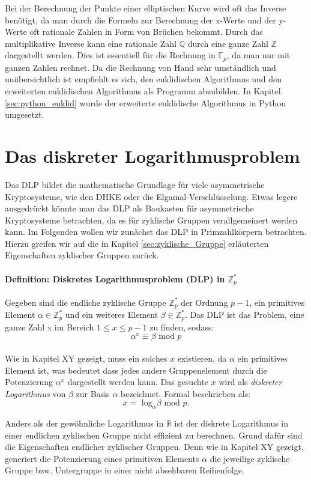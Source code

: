 Bei der Berechnung der Punkte einer elliptischen Kurve wird oft das Inverse benötigt, da man durch die Formeln zur Berechnung der x-Werte und der y-Werte oft rationale Zahlen in Form von Brüchen bekommt. Durch das multiplikative Inverse kann eine rationale Zahl $\mathbb{Q}$ durch eine ganze Zahl $\mathbb{Z}$ dargestellt werden. Dies ist essentiell für die Rechnung in $\mathbb{F}_p$, da man nur mit ganzen Zahlen rechnet. Da die Rechnung von Hand sehr umständlich und unübersichtlich ist empfiehlt es sich, den euklidischen Algorithmus und den erweiterten euklidischen Algorithmus als Programm abzubilden. In Kapitel \ref{sec:python_euklid} wurde der erweiterte euklidische Algorithmus in Python umgesetzt.

\section{Das diskreter Logarithmusproblem} \label{sec:Das_diskrete_Logarithmusproblem}
Das DLP bildet die mathematische Grundlage für viele asymmetrische Kryptosysteme, wie den DHKE oder die Elgamal-Verschlüsselung. Etwas legere ausgedrückt könnte man das DLP als Baukasten für asymmetrische Kryptosysteme betrachten, da es für zyklische Gruppen verallgemeinert werden kann. Im Folgenden wollen wir zunächst das DLP in Primzahlkörpern betrachten. Hierzu greifen wir auf die in Kapitel \ref{sec:zyklische_Gruppe} erläuterten Eigenschaften zyklischer Gruppen zurück. 

\paragraph{Definition: Diskretes Logarithmusproblem (DLP) in $\mathbb{Z}^*_p$}
Gegeben sind die endliche zyklische Gruppe $\mathbb{Z}^*_p$ der Ordnung $p-1$, ein primitives Element $\alpha \in \mathbb{Z}^*_p$ und ein weiteres Element $\beta \in \mathbb{Z}^*_p$. Das DLP ist das Problem, eine ganze Zahl x im Bereich $1 \leq x \leq p-1$ zu finden, sodass: $$\alpha^x \equiv \beta \text{ mod } p$$\\

Wie in Kapitel XY gezeigt, muss ein solches $x$ existieren, da $\alpha$ ein primitives Element ist, was bedeutet dass jedes andere Gruppenelement durch die Potenzierung $\alpha^x$ dargestellt werden kann. Das gesuchte $x$ wird als \textit{diskreter Logarithmus} von $\beta$ zur Basis $\alpha$ bezeichnet. Formal beschrieben als: $$x = \text{ log}_\alpha \beta \text{ mod } p \text{.}$$

Anders als der gewöhnliche Logarithmus in $\mathbb{R}$ ist der diskrete Logarithmus in einer endlichen zyklischen Gruppe nicht effizient zu berechnen. Grund dafür sind die Eigenschaften endlicher zyklischer Gruppen. Denn wie in Kapitel XY gezeigt, generiert die Potenzierung eines primitiven Elements $\alpha$ die jeweilige zyklische Gruppe bzw. Untergruppe in einer nicht absehbaren Reihenfolge.\\


